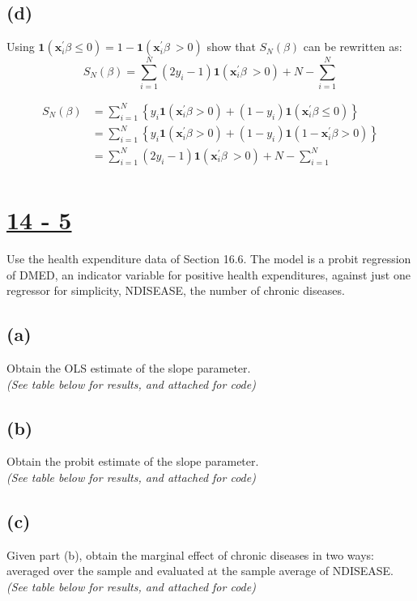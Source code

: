 \documentclass[11pt]{article}
\theoremstyle{definition}
\begin{document}
\subsection*{(d)}
Using $\boldsymbol{1}(\boldsymbol{x}_i^{'}\beta\leq0)=1-\boldsymbol{1}(\boldsymbol{x}_i^{'}\beta\ >0)$ show that $S_N(\beta)$ can be rewritten as: 
\begin{equation*}
S_N(\beta)=\sum^N_{i=1}(2y_i-1)\boldsymbol{1}(\boldsymbol{x}_i^{'}\beta\ >0)+N-\sum^N_{i=1}
\end{equation*}

\begin{equation*}
\begin{split}
S_N(\beta)&=\sum^N_{i=1}\left\{y_i\boldsymbol{1}(\boldsymbol{x}_i^{'}\beta>0)+(1-y_i)\boldsymbol{1}(\boldsymbol{x}_i^{'}\beta\leq0)\right\} \\
&=\sum^N_{i=1}\left\{y_i\boldsymbol{1}(\boldsymbol{x}_i^{'}\beta>0)+(1-y_i)\boldsymbol{1}(1-\boldsymbol{x}_i^{'}\beta>0)\right\} \\
&=\sum^N_{i=1}(2y_i-1)\boldsymbol{1}(\boldsymbol{x}_i^{'}\beta\ >0)+N-\sum^N_{i=1} \\
\end{split}
\end{equation*}

\section*{\underline{14 - 5}} 
Use the health expenditure data of Section 16.6.  The model is a probit regression of DMED, an indicator variable for positive health expenditures, against just one regressor for simplicity, NDISEASE, the number of chronic diseases.
\subsection*{(a)}
Obtain the OLS estimate of the slope parameter. \\
\textit{(See table below for results, and attached for code)}
\subsection*{(b)}
Obtain the probit estimate of the slope parameter. \\
\textit{(See table below for results, and attached for code)}
\subsection*{(c)}
Given part (b), obtain the marginal effect of chronic diseases in two ways: averaged over the sample and evaluated at the sample average of NDISEASE. \\
\textit{(See table below for results, and attached for code)}
\end{document}
